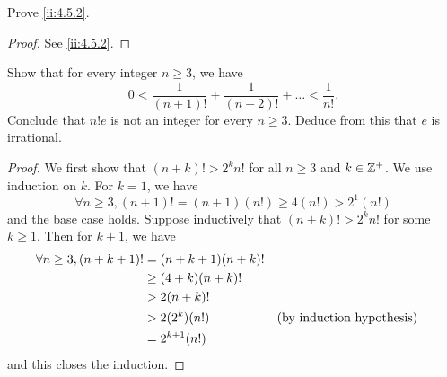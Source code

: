 \exercisesection

\begin{ex}\label{ii:ex:4.5.1}
  Prove \cref{ii:4.5.2}.
\end{ex}

\begin{proof}
  See \cref{ii:4.5.2}.
\end{proof}

\begin{ex}\label{ii:ex:4.5.2}
  Show that for every integer \(n \geq 3\), we have
  \[
    0 < \dfrac{1}{(n + 1)!} + \dfrac{1}{(n + 2)!} + \dots < \dfrac{1}{n!}.
  \]
  Conclude that \(n! e\) is not an integer for every \(n \geq 3\).
  Deduce from this that \(e\) is irrational.
\end{ex}

\begin{proof}
  We first show that \((n + k)! > 2^k n!\) for all \(n \geq 3\) and \(k \in \mathbb{Z}^+\).
  We use induction on \(k\).
  For \(k = 1\), we have
  \[
    \forall n \geq 3, (n + 1)! = (n + 1) (n!) \geq 4 (n!) > 2^1 (n!)
  \]
  and the base case holds.
  Suppose inductively that \((n + k)! > 2^k n!\) for some \(k \geq 1\).
  Then for \(k + 1\), we have
  \begin{align*}
    \forall n \geq 3, (n + k + 1)! & = (n + k + 1) (n + k)!            \\
                                   & \geq (4 + k)(n + k)!              \\
                                   & > 2 (n + k)!                      \\
                                   & > 2 (2^k) (n!)         &  & \text{(by induction hypothesis)} \\
                                   & = 2^{k + 1} (n!)
  \end{align*}
  and this closes the induction.


\end{proof}
